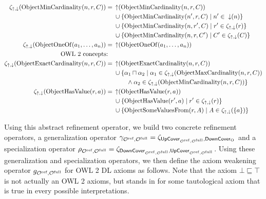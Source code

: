 {\begin{align*}
    \zeta_{\mathop{\uparrow}, \mathop{\downarrow}}(\mathrm{ObjectMinCardinality}(n, r, C)) ={} & \mathop{\uparrow} (\mathrm{ObjectMinCardinality}(n, r, C)) \\& \cup \{\mathrm{ObjectMinCardinality}(n', r, C) \mid n' \in \; \mathop{\downarrow} (n)\} \\& \cup \{\mathrm{ObjectMinCardinality}(n, r', C) \mid r' \in \zeta_{\mathop{\uparrow}, \mathop{\downarrow}}(r)\} \\& \cup \{\mathrm{ObjectMinCardinality}(n, r, C') \mid C' \in \zeta_{\mathop{\uparrow}, \mathop{\downarrow}} (C)\} \\
    \zeta_{\mathop{\uparrow}, \mathop{\downarrow}}(\mathrm{ObjectOneOf}(a_1, \dots, a_n)) ={} & \mathop{\uparrow} (\mathrm{ObjectOneOf}(a_1, \dots, a_n)) \\
    \text{OWL 2 concepts:} \quad & \\
    \zeta_{\mathop{\uparrow}, \mathop{\downarrow}}(\mathrm{ObjectExactCardinality}(n, r, C)) ={} & \mathop{\uparrow} (\mathrm{ObjectExactCardinality}(n, r, C)) \\& \cup \{ \alpha_1 \sqcap \alpha_2 \mid \alpha_1 \in \zeta_{\mathop{\uparrow}, \mathop{\downarrow}} (\mathrm{ObjectMaxCardinality}(n, r, C)) \\ \;& \qquad \land \alpha_2 \in \zeta_{\mathop{\uparrow}, \mathop{\downarrow}} (\mathrm{ObjectMinCardinality}(n, r, C)) \} \\
    \zeta_{\mathop{\uparrow}, \mathop{\downarrow}}(\mathrm{ObjectHasValue}(r, a)) ={} & \mathop{\uparrow} (\mathrm{ObjectHasValue}(r, a)) \\&  \cup \{\mathrm{ObjectHasValue}(r', a) \mid r' \in \zeta_{\mathop{\uparrow}, \mathop{\downarrow}} (r)\} \\&  \cup \{\mathrm{ObjectSomeValuesFrom}(r, A) \mid A \in \zeta_{\mathop{\uparrow}, \mathop{\downarrow}}  (\{a\})\}
\end{align*}
}

Using this abstract refinement operator, we build two concrete refinement operators, a generalization operator $\gamma_{{\mathcal{O}^\textnormal{ref}},{\mathcal{O}^\textnormal{full}}} = \zeta_{{\mathsf{UpCover}}_{{\mathcal{O}^\textnormal{ref}},{\mathcal{O}^\textnormal{full}}}, {\mathsf{DownCover}}_\mathrm{O}}$ and a specialization operator $\rho_{{\mathcal{O}^\textnormal{ref}},{\mathcal{O}^\textnormal{full}}} = \zeta_{{\mathsf{DownCover}}_{{\mathcal{O}^\textnormal{ref}},{\mathcal{O}^\textnormal{full}}}, {\mathsf{UpCover}}_{{\mathcal{O}^\textnormal{ref}},{\mathcal{O}^\textnormal{full}}}}$. Using these generalization and specialization operators, we then define the axiom weakening operator $g_{{\mathcal{O}^\textnormal{ref}},{\mathcal{O}^\textnormal{full}}}$ for OWL 2 DL axioms as follows. Note that the axiom $\bot \sqsubseteq \top$ is not actually an OWL 2 axioms, but stands in for some tautological axiom that is true in every possible interpretations.

